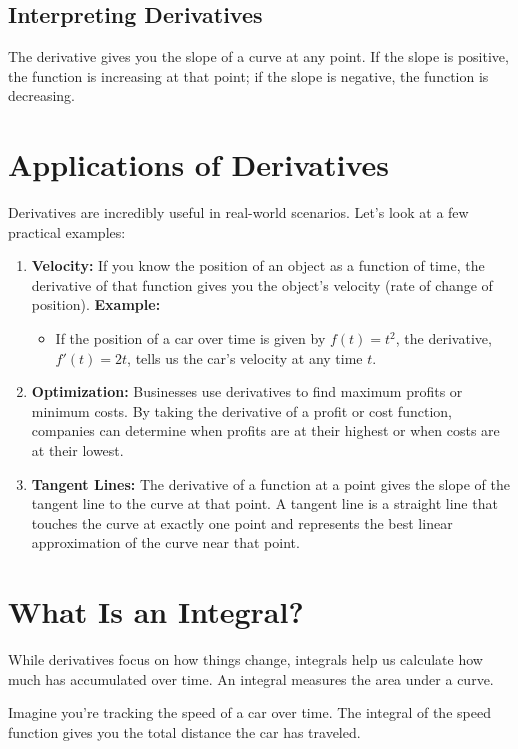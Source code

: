 \subsection{Interpreting Derivatives}
The derivative gives you the slope of a curve at any point. If the slope is positive, the function is increasing at that point; if the slope is negative, the function is decreasing.

\section{Applications of Derivatives}
Derivatives are incredibly useful in real-world scenarios. Let’s look at a few practical examples:
\begin{enumerate}
    \item \textbf{Velocity:} If you know the position of an object as a function of time, the derivative of that function gives you the object’s velocity (rate of change of position).
    \textbf{Example:}
    \begin{itemize}
        \item If the position of a car over time is given by \( f(t) = t^2 \), the derivative, \( f'(t) = 2t \), tells us the car’s velocity at any time \( t \).
    \end{itemize}
    \item \textbf{Optimization:} Businesses use derivatives to find maximum profits or minimum costs. By taking the derivative of a profit or cost function, companies can determine when profits are at their highest or when costs are at their lowest.
    \item \textbf{Tangent Lines:} The derivative of a function at a point gives the slope of the tangent line to the curve at that point. A tangent line is a straight line that touches the curve at exactly one point and represents the best linear approximation of the curve near that point.
\end{enumerate}

\section{What Is an Integral?}
While derivatives focus on how things change, integrals help us calculate how much has accumulated over time. An integral measures the area under a curve.

Imagine you’re tracking the speed of a car over time. The integral of the speed function gives you the total distance the car has traveled.

